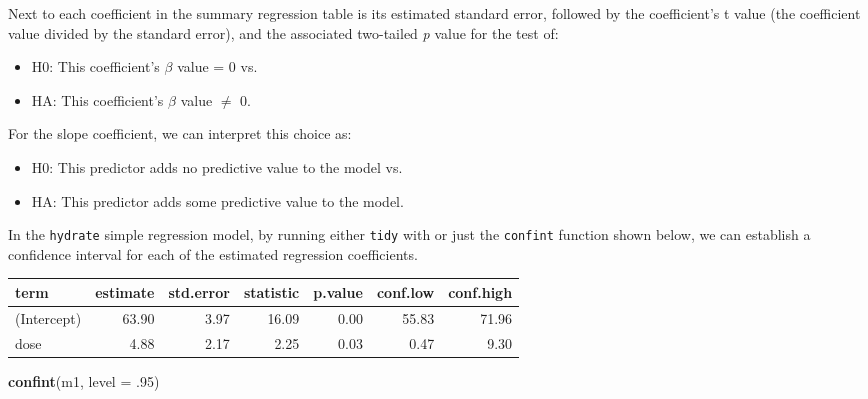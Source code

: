 \documentclass[
]{book}
\newenvironment{Shaded}{\begin{snugshade}}{\end{snugshade}}
\newcommand{\DataTypeTok}[1]{\textcolor[rgb]{0.13,0.29,0.53}{#1}}
\newcommand{\DecValTok}[1]{\textcolor[rgb]{0.00,0.00,0.81}{#1}}
\newcommand{\FloatTok}[1]{\textcolor[rgb]{0.00,0.00,0.81}{#1}}
\newcommand{\KeywordTok}[1]{\textcolor[rgb]{0.13,0.29,0.53}{\textbf{#1}}}
\newcommand{\NormalTok}[1]{#1}
\newcommand{\OperatorTok}[1]{\textcolor[rgb]{0.81,0.36,0.00}{\textbf{#1}}}
\newcommand{\OtherTok}[1]{\textcolor[rgb]{0.56,0.35,0.01}{#1}}
\newcommand{\StringTok}[1]{\textcolor[rgb]{0.31,0.60,0.02}{#1}}
\providecommand{\tightlist}{%
  \setlength{\itemsep}{0pt}\setlength{\parskip}{0pt}}
\begin{document}
Next to each coefficient in the summary regression table is its estimated standard error, followed by the coefficient's t value (the coefficient value divided by the standard error), and the associated two-tailed \emph{p} value for the test of:

\begin{itemize}
\tightlist
\item
  H0: This coefficient's \(\beta\) value = 0 vs.~
\item
  HA: This coefficient's \(\beta\) value \(\neq\) 0.
\end{itemize}

For the slope coefficient, we can interpret this choice as:

\begin{itemize}
\tightlist
\item
  H0: This predictor adds no predictive value to the model vs.~
\item
  HA: This predictor adds some predictive value to the model.
\end{itemize}

In the \texttt{hydrate} simple regression model, by running either \texttt{tidy} with or just the \texttt{confint} function shown below, we can establish a confidence interval for each of the estimated regression coefficients.

\begin{Shaded}
\end{Shaded}

\begin{tabular}{l|r|r|r|r|r|r}
\hline
term & estimate & std.error & statistic & p.value & conf.low & conf.high\\
\hline
(Intercept) & 63.90 & 3.97 & 16.09 & 0.00 & 55.83 & 71.96\\
\hline
dose & 4.88 & 2.17 & 2.25 & 0.03 & 0.47 & 9.30\\
\hline
\end{tabular}

\begin{Shaded}
\begin{Highlighting}[]
\KeywordTok{confint}\NormalTok{(m1, }\DataTypeTok{level =} \FloatTok{.95}\NormalTok{)}
\end{Highlighting}
\end{Shaded}
\end{document}
